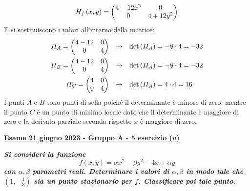 \documentclass[a4paper]{article}
\makeatletter
\newcommand{\definition}[1]{\textcolor{Red3}{\textbf{#1}}}
\newcommand{\example}[1]{\textcolor{Green4}{\textbf{#1}}}
\newenvironment{rowequmat}[1]{\left(\array{@{}#1@{}}}{\endarray\right)}
\makeatother
\begin{document}
	\begin{equation*}
		H_{f}\left(x,y\right) = \begin{rowequmat}{c c}
			4-12x^{2} & 0 \\
			0 & 4+12y^{2}
		\end{rowequmat}
	\end{equation*}
	E si sostituiscono i valori all'interno della matrice:
	\begin{equation*}
		\begin{array}{rcl}
			H_{A} = \begin{rowequmat}{c c}
				4-12 & 0 \\
				0 & 4
			\end{rowequmat} & \rightarrow & \det\left(H_{A}\right) = -8 \cdot 4 = -32 \\ [1em]
			H_{B} = \begin{rowequmat}{c c}
				4-12 & 0 \\
				0 & 4
			\end{rowequmat} & \rightarrow & \det\left(H_{A}\right) = -8 \cdot 4 = -32 \\ [1em]
			H_{C} = \begin{rowequmat}{c c}
				4 & 0 \\
				0 & 4
			\end{rowequmat} & \rightarrow & \det\left(H_{A}\right) = 4 \cdot 4 = 16 \\
		\end{array}
	\end{equation*}
	I punti $A$ e $B$ sono punti di sella poiché il determinante è minore di zero, mentre il punto $C$ è un punto di minimo locale dato che il determinante è maggiore di zero e la derivata parziale seconda rispetto $x$ è maggiore di zero.

	\newpage

	\begin{flushleft}
		\label{exam: esame 21 giugno 2023 - Gruppo A - 5 esercizio (a)}
		\hypertarget{
			exam: esame 21 giugno 2023 - Gruppo A - 5 esercizio (a)
		}{
			\definition{\underline{Esame 21 giugno 2023 - Gruppo A - 5 esercizio (\emph{a})}}
		}
	\end{flushleft}
	\example{\emph{Si consideri la funzione}
	\begin{equation*}
		f\left(x,y\right) = \alpha x^{2} - \beta y^{2} - 4x + \alpha y
	\end{equation*}
	\emph{con $\alpha, \beta$ parametri reali. Determinare i valori di $\alpha,\beta$ in modo tale che $\left(1, -\frac{1}{3}\right)$ sia un punto stazionario per $f$. Classificare poi tale punto.}}\newline
\end{document}
